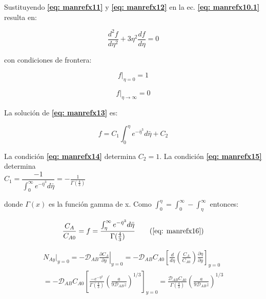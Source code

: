 Sustituyendo \textbf{\eqref{eq: manrefx11}} y \textbf{\eqref{eq: manrefx12}} en la ec. \textbf{\eqref{eq: manrefx10.1}} resulta en:

\begin{equation} \label{eq: manrefx13}
	\frac{d^2 f}{d \eta^2} + 3 \eta^2 \frac{df}{d \eta} = 0
\end{equation}

con condiciones de frontera:

\begin{equation} \label{eq: manrefx14}
	f|_{\eta = 0} = 1
\end{equation}

\begin{equation} \label{eq: manrefx15}
	f|_{\eta \to \infty} = 0
\end{equation}

La solución de \textbf{\eqref{eq: manrefx13}} es:

\begin{equation} \label{eq: manrefx16}
	f = C_1 \int_0^\eta e^{-\bar{\eta}^3} d \bar{\eta} + C_2
\end{equation}

La condición \textbf{\eqref{eq: manrefx14}} determina $C_2 = 1$. La condición \textbf{\eqref{eq: manrefx15}} determina \\ $C_1 = \dfrac{-1}{\int_0^\infty e^{-\bar{\eta}^3} d \bar{\eta}} = - \frac{1}{\Gamma (\frac{4}{3})}$ 

donde $\Gamma (x)$ es la función gamma de x. Como $\int_0^\eta = \int_0^\infty - \int_\eta^\infty$ entonces:

\begin{equation} \label{eq: manrefx16.1}
	\frac{C_A}{C_{A0}} = f =  \frac{\int_\eta^\infty e^{-\bar{\eta}^3} d\bar{\eta}}{\Gamma(\frac{4}{3})}
	\tag{\eqref{eq: manrefx16}}
\end{equation}

\begin{equation}
	\begin{split}
	N_{Ay}|_{y=0} = - \mathscr{D}_{AB} \left.  \frac{\partial C_A}{\partial y} \right|_{y=0} = - \mathscr{D}_{AB} C_{A0} \left[ \frac{d}{d\eta} \left( \frac{C_A}{C_{A0}} \right) \frac{\partial \eta}{\partial y} \right]_{y=0} 
	\\
  = -\mathscr{D}_{AB} C_{A0} \left[ \frac{- e^{-\eta^3}}{\Gamma(\frac{4}{3})} \left( \frac{a}{9 \mathscr{D}_{AB}z} \right)^{1/3} \right]_{y=0} = \frac{\mathscr{D}_{AB} C_{A0}}{\Gamma (\frac{4}{3})} \left( \frac{a}{9 \mathscr{D}_{AB} z} \right)^{1/3}
	\end{split}
\end{equation}

